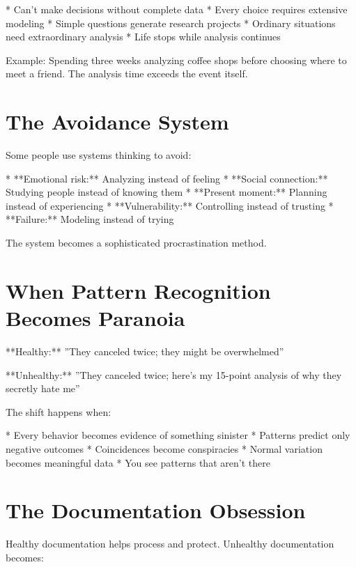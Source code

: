 \documentclass[12pt,oneside]{book}
\begin{document}
                    * Can't make decisions without complete data
                    * Every choice requires extensive modeling
                    * Simple questions generate research projects
                    * Ordinary situations need extraordinary analysis
                    * Life stops while analysis continues

Example: Spending three weeks analyzing coffee shops before choosing where to meet a friend. The analysis time exceeds the event itself.

\section{The Avoidance System}

Some people use systems thinking to avoid:

                    * **Emotional risk:** Analyzing instead of feeling
                    * **Social connection:** Studying people instead of knowing them
                    * **Present moment:** Planning instead of experiencing
                    * **Vulnerability:** Controlling instead of trusting
                    * **Failure:** Modeling instead of trying

The system becomes a sophisticated procrastination method.

\section{When Pattern Recognition Becomes Paranoia}

**Healthy:** ''They canceled twice; they might be overwhelmed''

                **Unhealthy:** ''They canceled twice; here's my 15-point analysis of why they secretly hate me''

The shift happens when:

                    * Every behavior becomes evidence of something sinister
                    * Patterns predict only negative outcomes
                    * Coincidences become conspiracies
                    * Normal variation becomes meaningful data
                    * You see patterns that aren't there

\section{The Documentation Obsession}

Healthy documentation helps process and protect. Unhealthy documentation becomes:
\end{document}
